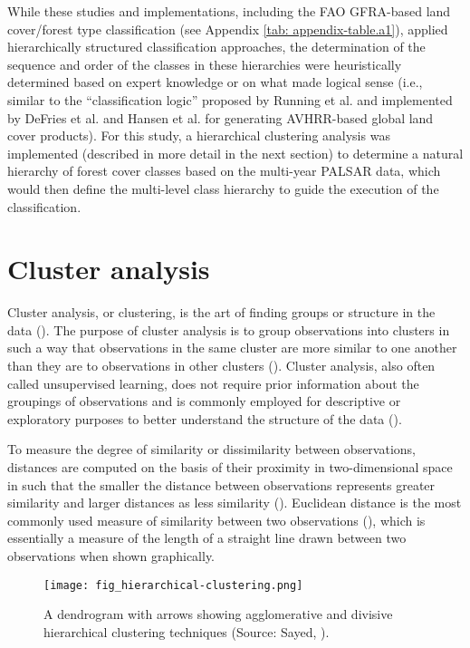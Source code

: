 While these studies and implementations, including the FAO GFRA-based land cover/forest type classification (see Appendix \ref{tab: appendix-table.a1}), applied hierarchically structured classification approaches, the determination of the sequence and order of the classes in these hierarchies were heuristically determined based on expert knowledge or on what made logical sense (i.e., similar to the \enquote{classification logic} proposed by Running et al. \citeyearpar{running_remote_1995} and implemented by DeFries et al. \citeyearpar{defries_global_1998} and Hansen et al. \citeyearpar{hansen_global_2000} for generating AVHRR-based global land cover products). For this study, a hierarchical clustering analysis was implemented (described in more detail in the next section) to determine a natural hierarchy of forest cover classes based on the multi-year PALSAR data, which would then define the multi-level class hierarchy to guide the execution of the classification.

\section{Cluster analysis}
\label{sec: litrev-cluster-analysis}

Cluster analysis, or clustering, is the art of finding groups or structure in the data (\cite{kaufman_introduction_1990}). The purpose of cluster analysis is to group observations into clusters in such a way that observations in the same cluster are more similar to one another than they are to observations in other clusters (\cite{bajorski_statistics_2011}). Cluster analysis, also often called unsupervised learning, does not require prior information about the groupings of observations and is commonly employed for descriptive or exploratory purposes to better understand the structure of the data (\cite{bajorski_statistics_2011}).

To measure the degree of similarity or dissimilarity between observations, distances are computed on the basis of their proximity in two-dimensional space in such that the smaller the distance between observations represents greater similarity and larger distances as less similarity (\cite{hair_multivariate_2013}). Euclidean distance is the most commonly used measure of similarity between two observations (\cite{kaufman_introduction_1990}), which is essentially a measure of the length of a straight line drawn between two observations when shown graphically.

\begin{figure}
	\centering
	\texttt{[image: fig\_hierarchical-clustering.png]}
	\caption[A dendrogram with arrows showing agglomerative and divisive hierarchical clustering techniques.]{A dendrogram with arrows showing agglomerative and divisive hierarchical clustering techniques (Source: Sayed, \citeyear{sayed_hierarchical_2016}).}
	\label{fig: litrev-fig2.2}
\end{figure}

